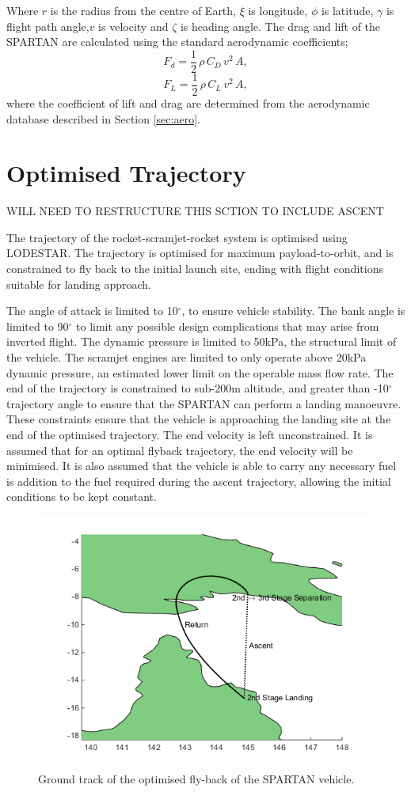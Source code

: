 \documentclass[journal]{new-aiaa} %
\begin{document}
Where $r$ is the radius from the centre of Earth, $\xi$ is longitude, $\phi$ is latitude, $\gamma$ is flight path angle,$v$ is velocity and $\zeta$ is heading angle. The drag and lift of the SPARTAN are calculated using the standard aerodynamic coefficients;
\begin{equation}
F_d = \frac{1}{2} \, \rho \, C_D \, v^2 \, A ,
\end{equation}
\begin{equation}
F_L = \frac{1}{2} \, \rho \, C_L \, v^2 \, A ,
\end{equation}
where the coefficient of lift and drag are determined from the aerodynamic database described in Section \ref{sec:aero}.


\section{Optimised Trajectory}
WILL NEED TO RESTRUCTURE THIS SCTION TO INCLUDE ASCENT


The trajectory of the rocket-scramjet-rocket system is optimised using LODESTAR. The trajectory is optimised for maximum payload-to-orbit, and is constrained to fly back to the initial launch site, ending with flight conditions suitable for landing approach. 


 The angle of attack is limited to 10$^\circ$, to ensure vehicle stability. The bank angle is limited to 90$^\circ$ to limit any possible design complications that may arise from inverted flight. The dynamic pressure is limited to 50kPa, the structural limit of the vehicle. The scramjet engines are limited to only operate above 20kPa dynamic pressure, an estimated lower limit on the operable mass flow rate.
The end of the trajectory is constrained to sub-200m altitude, and greater than -10$^\circ$ trajectory angle to ensure that the SPARTAN can perform a landing manoeuvre. These constraints ensure that the vehicle is approaching the landing site at the end of the optimised trajectory. The end velocity is left unconstrained. It is assumed that for an optimal flyback trajectory, the end velocity will be minimised. 
It is also assumed that the vehicle is able to carry any necessary fuel is addition to the fuel required during the ascent trajectory, allowing the initial conditions to be kept constant. 

\begin{figure}[ht]
	\centering
	\includegraphics[width=0.6\linewidth]{Figures/lon-lat}
	\caption{Ground track of the optimised fly-back of the SPARTAN vehicle.}
	\label{fig:lon-lat}
\end{figure} 
\end{document}

